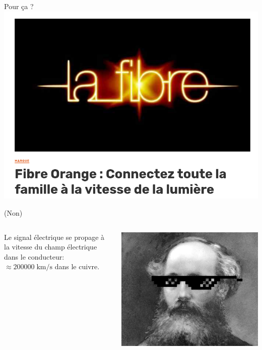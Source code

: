 \documentclass[aspectratio=149, 10pt, t]{beamer}
\begin{document}
\begin{frame}{Pour ça ?}
    \centering
    \includegraphics[width=0.7\linewidth]{images/pub_fibre.png}
\end{frame}

\begin{frame}{(Non)}
    \begin{columns}
    \begin{column}{0.5\linewidth}
        \vspace{2.25cm}
        \begin{minipage}[t]{\linewidth}
            Le signal électrique se propage à la vitesse du champ électrique dans le conducteur: \alert{$\approx 200 000\;\text{km}/\text{s}$ dans le cuivre}.
        \end{minipage}
    \end{column}
    \begin{column}{0.5\linewidth}
        \vspace{0.5cm}
        \begin{minipage}[t]{\linewidth}
            \includegraphics[width=\linewidth]{images/maxwell.jpeg}
        \end{minipage}
    \end{column}
    \end{columns}
\end{frame}
\end{document}
